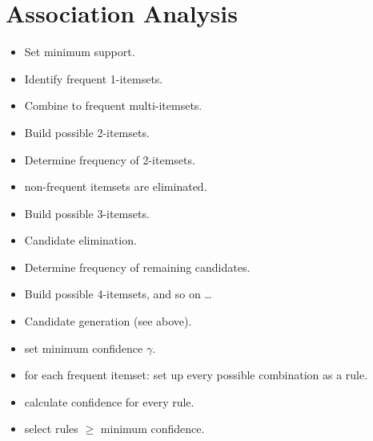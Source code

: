 
\section{Association Analysis}

\begin{breakbox}
\begin{itemize}
	\item Set minimum support.
	\item Identify frequent 1-itemsets.
	\item Combine to frequent multi-itemsets.
	\item Build possible 2-itemsets.
	\item Determine frequency of 2-itemsets.
	\item non-frequent itemsets are eliminated.
	\item Build possible 3-itemsets.
	\item Candidate elimination.
	\item Determine frequency of remaining candidates.
	\item Build possible 4-itemsets, and so on \ldots
\end{itemize}
\end{breakbox}

\begin{breakbox}
\begin{itemize}
	\item Candidate generation (see above).
	\item set minimum confidence $\gamma$.
	\item for each frequent itemset: set up every possible combination as a rule.
	\item calculate confidence for every rule.
	\item select rules $\geq$ minimum confidence.
\end{itemize}
\end{breakbox}

